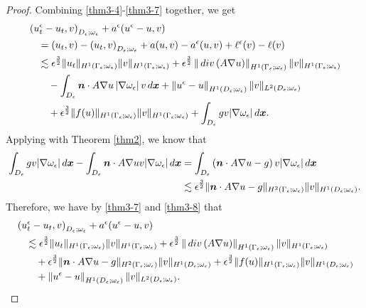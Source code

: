 \documentclass[10pt,a4paper]{amsart}
\newcommand{\dd}{\,{\rm d}}
\newcommand{\divo}{\,{\rm div}}
\begin{document}
\begin{proof}
	
	Combining \eqref{thm3-4}-\eqref{thm3-7} together, we get
	\begin{equation}
		\label{thm3-8}
		\begin{aligned}
			&\left(u_t^{\epsilon}-u_t,v\right)_{D_{\epsilon};\omega_{\epsilon}}+a^{\epsilon}(u^{\epsilon}-u,v)\\
			&\quad=\left(u_t,v\right)-\left(u_t,v\right)_{D_{\epsilon};\omega_{\epsilon}}+a(u,v)-a^{\epsilon}(u,v)+\ell^{\epsilon}(v)-\ell(v)\\	
			&\quad\lesssim\epsilon^{\frac 3 2}\|u_t\|_{H^1(\Gamma_{\epsilon};\omega_{\epsilon})}\|v\|_{H^1(\Gamma_{\epsilon};\omega_{\epsilon})}+\epsilon^{\frac 3 2}\left\|\divo\left(A\nabla u\right)\right\|_{H^1(\Gamma_{\epsilon};\omega_{\epsilon})}\|v\|_{H^1(\Gamma_{\epsilon};\omega_{\epsilon})}\\
			&\qquad-\int_{D_{\epsilon}} \bm n\cdot A\nabla u\left|\nabla\omega_{\epsilon}\right|v\dd\bm x+\left\|u^{\epsilon}-u\right\|_{H^1(D_{\epsilon};\omega_{\epsilon})}\|v\|_{L^2(D_{\epsilon};\omega_{\epsilon})}\\
			&\qquad+\epsilon^{\frac 3 2}\|f(u)\|_{H^1(\Gamma_{\epsilon};\omega_{\epsilon})}\|v\|_{H^1(\Gamma_{\epsilon};\omega_{\epsilon})}+\int_{D_{\epsilon}} gv|\nabla\omega_{\epsilon}|\dd \bm x.
		\end{aligned}
	\end{equation}
	Applying with Theorem \ref{thm2}, we know that
	\begin{equation}\label{thm3-9}
		\begin{aligned}
			\int_{D_{\epsilon}} gv|\nabla\omega_{\epsilon}|\dd \bm x-\int_{D_{\epsilon}}\bm n\cdot A\nabla uv|\nabla\omega_{\epsilon}|\dd \bm x
			&=\int_{D_{\epsilon}}\left(\bm n\cdot A\nabla u-g \right)v|\nabla \omega_{\epsilon}|\dd \bm x\notag\\
			&\lesssim\epsilon^{\frac 3 2}\|\bm n\cdot A\nabla u-g\|_{H^2(\Gamma_{\epsilon};\omega_{\epsilon})}\|v\|_{H^1(D_{\epsilon};\omega_{\epsilon})}.
		\end{aligned}
	\end{equation}
	Therefore, we have by  \eqref{thm3-7}   and \eqref{thm3-8} that
	\begin{equation}\label{thm3-10}
		\begin{aligned}
			&\left(u_t^{\epsilon}-u_t,v\right)_{D_{\epsilon};\omega_{\epsilon}}+a^{\epsilon}(u^{\epsilon}-u,v)\\
			&\quad\lesssim\epsilon^{\frac 3 2}\|u_t\|_{H^1(\Gamma_{\epsilon};\omega_{\epsilon})}\|v\|_{H^1(\Gamma_{\epsilon};\omega_{\epsilon})}+\epsilon^{\frac 3 2}\left\|\divo\left(A\nabla u\right)\right\|_{H^1(\Gamma_{\epsilon};\omega_{\epsilon})}\|v\|_{H^1(\Gamma_{\epsilon};\omega_{\epsilon})}\\
			&\qquad+\epsilon^{\frac 3 2}\|\bm n\cdot A\nabla u-g\|_{H^2(\Gamma_{\epsilon};\omega_{\epsilon})}\|v\|_{H^1(D_{\epsilon};\omega_{\epsilon})}+\epsilon^{\frac 3 2}\|f(u)\|_{H^1(\Gamma_{\epsilon};\omega_{\epsilon})}\|v\|_{H^1(D_{\epsilon};\omega_{\epsilon})}\\
			&\qquad +\left\|u^{\epsilon}-u\right\|_{H^1(D_{\epsilon};\omega_{\epsilon})}\|v\|_{L^2(D_{\epsilon};\omega_{\epsilon})}.
		\end{aligned}
	\end{equation}
	

\end{proof}
\end{document}
